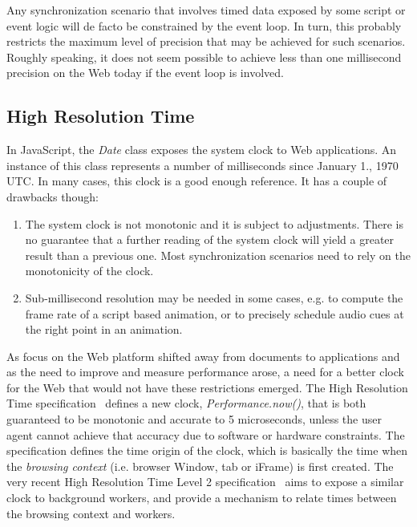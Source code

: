 Any synchronization scenario that involves timed data exposed by some script
or event logic will de facto be constrained by the event loop. In turn, this
probably restricts the maximum level of precision that may be achieved for
such scenarios. Roughly speaking, it does not seem possible to achieve less
than one millisecond precision on the Web today if the event loop is involved.


\subsection{High Resolution Time}
\label{sec:hrt}

In JavaScript, the \emph{Date} class exposes the system clock to Web
applications. An instance of this class represents a number of milliseconds
since January 1., 1970 UTC. In many cases, this clock is a good enough
reference. It has a couple of drawbacks though:

\begin{enumerate}

\item{

The system clock is not monotonic and it is subject to adjustments. There is
no guarantee that a further reading of the system clock will yield a greater
result than a previous one. Most synchronization scenarios need to rely on the
monotonicity of the clock. 

}
\item {

Sub-millisecond resolution may be needed in some
cases, e.g. to compute the frame rate of a script based animation, or to
precisely schedule audio cues at the right point in an animation.

}

\end{enumerate}

As focus on the Web platform shifted away from documents to applications and
as the need to improve and measure performance arose, a need for a better
clock for the Web that would not have these restrictions emerged. The High
Resolution Time specification~\cite{hrt1} defines a new clock,
\emph{Performance.now()}, that is both guaranteed to be monotonic and accurate
to 5 microseconds, unless the user agent cannot achieve that accuracy due to
software or hardware constraints. The specification defines the time origin of
the clock, which is basically the time when the \emph{browsing context} (i.e.
browser Window, tab or iFrame) is first created. The very recent High
Resolution Time Level 2 specification~\cite{hrt2} aims to expose a similar
clock to background workers, and provide a mechanism to relate times between
the browsing context and workers.

